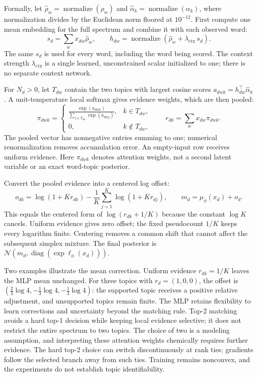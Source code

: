 \documentclass[10pt,a4paper]{article}
\newcommand{\normalize}{\operatorname{normalize}}
\newcommand{\ctxscale}{\lambda_{\mathrm{ctx}}}
\begin{document}
Formally, let
$\widehat\rho_w=\normalize(\rho_w)$ and
$\widehat\alpha_k=\normalize(\alpha_k)$, where normalization divides by the
Euclidean norm floored at $10^{-12}$.
First compute one mean embedding for the full spectrum and combine it with
each observed word:
\begin{equation}
 s_d=\sum_w x_{dw}\widehat\rho_w,\qquad
 h_{dw}=\normalize(\widehat\rho_w+\ctxscale\,s_d).
 \label{eq:document-context}
\end{equation}
The same $s_d$ is used for every word, including the word being scored.
The context strength $\ctxscale$ is a single learned, unconstrained scalar initialized
to one; there is no separate context network.

For $N_d>0$, let $T_{dw}$ contain the two topics with largest cosine scores
$a_{dwk}=h_{dw}^{\top}\widehat\alpha_k$. A unit-temperature local softmax
gives evidence weights, which are then pooled:
\begin{equation}
 \pi_{dwk}=
 \begin{cases}
 \displaystyle\frac{\exp(a_{dwk})}{\sum_{j\in T_{dw}}\exp(a_{dwj})},
      & k\in T_{dw},\\[5pt]
 0, & k\notin T_{dw},
 \end{cases}
 \qquad r_{dk}=\sum_w x_{dw}\pi_{dwk}.
 \label{eq:document-evidence}
\end{equation}
The pooled vector has nonnegative entries summing to one; numerical
renormalization removes accumulation error. An empty-input row receives
uniform evidence. Here $\pi_{dwk}$ denotes attention weights, not a second
latent variable or an exact word-topic posterior.

Convert the pooled evidence into a centered log offset:
\begin{equation}
 o_{dk}=\log(1+Kr_{dk})-\frac1K\sum_{j=1}^{K}\log(1+Kr_{dj}),
 \qquad m_d=\mu_\phi(x_d)+o_d.
 \label{eq:posterior-offset}
\end{equation}
This equals the centered form of $\log(r_{dk}+1/K)$ because the constant
$\log K$ cancels. Uniform evidence gives zero offset; the fixed pseudocount
$1/K$ keeps every logarithm finite. Centering removes a common shift that
cannot affect the subsequent simplex mixture. The final posterior is
$\mathcal N(m_d,\operatorname{diag}(\exp\ell_\phi(x_d)))$.

Two examples illustrate the mean correction. Uniform evidence
$r_{dk}=1/K$ leaves the MLP mean unchanged. For three topics with
$r_d=(1,0,0)$, the offset is
$(\tfrac23\log4,-\tfrac13\log4,-\tfrac13\log4)$: the supported topic receives
a positive relative adjustment, and unsupported topics remain finite.
The MLP retains flexibility to learn corrections and
uncertainty beyond the matching rule. Top-2 matching avoids a hard top-1
decision while keeping local evidence selective; it does not restrict the
entire spectrum to two topics. The choice of two is a modeling assumption,
and interpreting these attention weights chemically requires further evidence.
The hard top-2 choice can switch discontinuously at rank ties; gradients
follow the selected branch away from such ties. Training remains nonconvex,
and the experiments do not establish topic identifiability.
\end{document}
